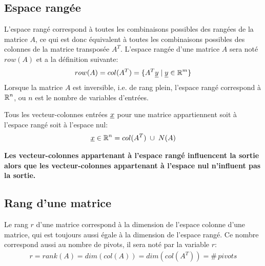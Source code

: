 \subsection{Espace rangée}
\label{sec:esprow}

L'espace rangé correspond à toutes les combinaisons possibles des rangées de la matrice $A$, ce qui est donc équivalent à toutes les combinaisons possibles des colonnes de la matrice transposée $A^T$. L'espace rangée d'une matrice $A$ sera noté $row(A)$ et a la définition suivante:
\begin{align}
row(A) =  col(A^T) = 
\{ A^T \underline{y} \; | \; \underline{y} \in \operatorname{\mathbb{R}}^m \}
\end{align}
Lorsque la matrice $A$ est inversible, i.e. de rang plein, l'espace rangé correspond à $\operatorname{\mathbb{R}}^n$, ou $n$ est le nombre de variables d'entrées.

Tous les vecteur-colonnes entrées $\underline{x}$ pour une matrice appartiennent soit à l'espace rangé soit à l'espace nul:
\begin{align}
\col{x} \in \re^n = col(A^T) \; \cup \; N(A) %
\end{align}

\textbf{Les vecteur-colonnes appartenant à l'espace rangé influencent la sortie alors que les vecteur-colonnes appartenant à l'espace nul n'influent pas la sortie.} 






\subsection{Rang d'une matrice}
\label{sec:rang}

Le rang $r$ d'une matrice correspond à la dimension de l'espace colonne d'une matrice, qui est toujours aussi égale à la dimension de l'espace rangé. Ce nombre correspond aussi au nombre de pivots, il sera noté par la variable $r$:
\begin{align}
r = rank( A ) = dim( col(A) ) = dim( col(A^T) ) =\#\, pivots
\end{align}


